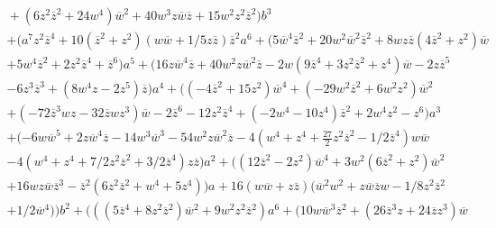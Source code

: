 \documentclass[12pt]{amsart}
\begin{document}
\begin{footnotesize}
\begin{multline*}
{}+ ( 6{z}^{2}{{ \overline{z}}}^{2}+24{w}^{4} ) {{ \overline{w}}}^{2}+
40{w}^{3}z{ \overline{w}}{ \overline{z}}+15{w}^{2}{z}^{2}{{ \overline{z}}}^{2}
 ) {b}^{3}\\
 + ( {a}^{7}{z}^{2}{{ \overline{z}}}^{4}+10 ( {{
 \overline{z}}}^{2}+{z}^{2} )  ( w{ \overline{w}}+1/5z{ \overline{z}} ) 
{{ \overline{z}}}^{2}{a}^{6}+ ( 5{{ \overline{w}}}^{4}{{ \overline{z}}}^{2}+20{w}^
{2}{{ \overline{w}}}^{2}{{ \overline{z}}}^{2}+8wz{ \overline{z}} ( 4{{ \overline{z}}}^{
2}+{z}^{2} ) { \overline{w}}\\
+5{w}^{4}{{ \overline{z}}}^{2}+2{z}^{2}{{ 
\overline{z}}}^{4}+{{ \overline{z}}}^{6} ) {a}^{5}+ ( 16z{{ \overline{w}}}^{4}{
 \overline{z}}+40{w}^{2}z{{ \overline{w}}}^{2}{ \overline{z}}-2w ( 9{{ \overline{z}}}^{
4}+3{z}^{2}{{ \overline{z}}}^{2}+{z}^{4} ) { \overline{w}}-2z{{ \overline{z}}}^{5
}\\
-6{z}^{3}{{ \overline{z}}}^{3}+ ( 8{w}^{4}z-2{z}^{5} ) {
 \overline{z}} ) {a}^{4}+ (  ( -4{{ \overline{z}}}^{2}+15{z}^{2}
 ) {{ \overline{w}}}^{4}+ ( -29{w}^{2}{{ \overline{z}}}^{2}+6{w}^{2}{
z}^{2} ) {{ \overline{w}}}^{2}\\
+ ( -72{{ \overline{z}}}^{3}wz-32{ 
\overline{z}}w{z}^{3} ) { \overline{w}}-2{{ \overline{z}}}^{6}-12{z}^{2}{{ \overline{z}}}
^{4}+ ( -2{w}^{4}-10{z}^{4} ) {{ \overline{z}}}^{2}+2{w}^{4}
{z}^{2}-{z}^{6} ) {a}^{3}\\
+ ( -6w{{ \overline{w}}}^{5}+2z{{ 
\overline{w}}}^{4}{ \overline{z}}-14{w}^{3}{{ \overline{w}}}^{3}-54{w}^{2}z{{ \overline{w}}}^{2}{
 \overline{z}}-4 ( {w}^{4}+{z}^{4}+{\frac {27}{2}}{z}^{2}{{ \overline{z}}}^
{2}-1/2{{ \overline{z}}}^{4} ) w{ \overline{w}}\\
-4 ( {w}^{4}+{z}^{4}+7
/2{z}^{2}{{ \overline{z}}}^{2}+3/2{{ \overline{z}}}^{4} ) z{ \overline{z}}
 ) {a}^{2}+ (  ( 12{{ \overline{z}}}^{2}-2{z}^{2}
 ) {{ \overline{w}}}^{4}+3{w}^{2} ( 6{{ \overline{z}}}^{2}+{z}^{2}
 ) {{ \overline{w}}}^{2}\\
 +16wz{ \overline{w}}{{ \overline{z}}}^{3}-{{ \overline{z}}}^{2}
 ( 6{z}^{2}{{ \overline{z}}}^{2}+{w}^{4}+5{z}^{4} )  ) a
+16 ( w{ \overline{w}}+z{ \overline{z}} )  ( {{ \overline{w}}}^{2}{w}^{2}
+z{ \overline{w}}{ \overline{z}}w-1/8{z}^{2}{{ \overline{z}}}^{2}\\
+1/2{{ \overline{w}}}^{4}
 )  ) {b}^{2}+ (  (  ( 5{{ \overline{z}}}^{4}+8
{z}^{2}{{ \overline{z}}}^{2} ) {{ \overline{w}}}^{2}+9{w}^{2}{z}^{2}{{ 
\overline{z}}}^{2} ) {a}^{6}+ ( 10w{{ \overline{w}}}^{3}{{ \overline{z}}}^{2}+
 ( 26{{ \overline{z}}}^{3}z+24{ \overline{z}}{z}^{3} ) {{ \overline{w}}}^{
}
\end{multline*}
\end{footnotesize}
\end{document}
